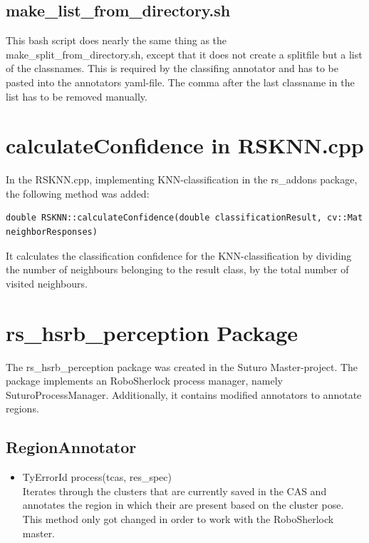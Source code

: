\documentclass[main.tex]{subfiles}
\begin{document}
\begin{itemize}
\subsection{make\_list\_from\_directory.sh}
This bash script does nearly the same thing as the make\_split\_from\_directory.sh, except that it does not create a splitfile but a list of the classnames. This is required by the classifing annotator and has to be pasted into the annotators yaml-file. The comma after the last classname in the list has to be removed manually.

\section{calculateConfidence in RSKNN.cpp}
In the RSKNN.cpp, implementing KNN-classification in the rs\_addons package, the following method was added:

\begin{lstlisting}
double RSKNN::calculateConfidence(double classificationResult, cv::Mat neighborResponses)
\end{lstlisting}

It calculates the classification confidence for the KNN-classification by dividing the number of neighbours belonging to the result class, by the total number of visited neighbours. 

\end{itemize}


\section{rs\_hsrb\_perception Package}

The rs\_hsrb\_perception package was created in the Suturo Master-project. The package implements an RoboSherlock process manager, namely SuturoProcessManager. Additionally, it contains modified annotators to annotate regions.

\subsection{RegionAnnotator}
\begin{itemize}
\item TyErrorId process(tcas, res\_spec)\\
Iterates through the clusters that are currently saved in the CAS and annotates the region in which their are present based on the cluster pose.
This method only got changed in order to work with the RoboSherlock master.
\end{itemize}
\end{document}
